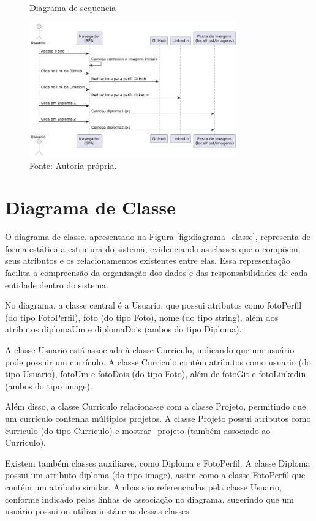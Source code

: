 \begin{figure} [h!]	
    \centering
    \caption{Diagrama de sequencia}
    \includegraphics[width=0.8\textwidth]{Figures/diagrama_sequencia.png}
    \caption*{Fonte: Autoria própria.}
    \label{fig:diagrama_sequencia}
\end{figure}

\clearpage

\section{Diagrama de Classe}
\label{sec:classe}

O diagrama de classe, apresentado na Figura \ref{fig:diagrama_classe}, representa de forma estática a estrutura do sistema, evidenciando as classes que o compõem, seus atributos e os relacionamentos existentes entre elas. Essa representação facilita a compreensão da organização dos dados e das responsabilidades de cada entidade dentro do sistema.

No diagrama, a classe central é a Usuario, que possui atributos como fotoPerfil (do tipo FotoPerfil), foto (do tipo Foto), nome (do tipo string), além dos atributos diplomaUm e diplomaDois (ambos do tipo Diploma).

A classe Usuario está associada à classe Curriculo, indicando que um usuário pode possuir um currículo. A classe Curriculo contém atributos como usuario (do tipo Usuario), fotoUm e fotoDois (do tipo Foto), além de fotoGit e fotoLinkedin (ambos do tipo image).

Além disso, a classe Curriculo relaciona-se com a classe Projeto, permitindo que um currículo contenha múltiplos projetos. A classe Projeto possui atributos como curriculo (do tipo Curriculo) e mostrar\_projeto (também associado ao Curriculo).

Existem também classes auxiliares, como Diploma e FotoPerfil. A classe Diploma possui um atributo diploma (do tipo image), assim como a classe FotoPerfil que contém um atributo similar. Ambas são referenciadas pela classe Usuario, conforme indicado pelas linhas de associação no diagrama, sugerindo que um usuário possui ou utiliza instâncias dessas classes.

